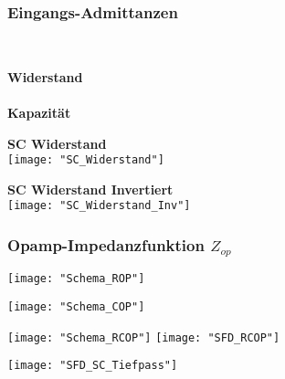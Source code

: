 \subsubsection{Eingangs-Admittanzen}
\\
\begin{minipage}[t]{0.2\textwidth}
	\textbf{Widerstand}\\
	\\
	
	\textbf{Kapazität}\\
\end{minipage}\hspace{0.05\textwidth}
\begin{minipage}[t]{0.3\textwidth}
	\textbf{SC Widerstand}\\
	\texttt{[image: "SC\_Widerstand"]}
\end{minipage}\hspace{0.05\textwidth}
\begin{minipage}[t]{0.3\textwidth}
	\textbf{SC Widerstand Invertiert}\\
	\texttt{[image: "SC\_Widerstand\_Inv"]}
\end{minipage}



\subsubsection{Opamp-Impedanzfunktion $Z_{op}$}
\begin{minipage}[t]{0.2\textwidth}
	\vspace{0pt}
	\centering
	\texttt{[image: "Schema\_ROP"]}
\end{minipage}\hspace{0.05\textwidth}
\begin{minipage}[t]{0.2\textwidth}
	\vspace{0pt}
	\centering
	\texttt{[image: "Schema\_COP"]}
\end{minipage}\hspace{0.05\textwidth}
\begin{minipage}[t]{0.2\textwidth}
	\vspace{0pt}
	\centering
	\texttt{[image: "Schema\_RCOP"]}
		\texttt{[image: "SFD\_RCOP"]}
\end{minipage}\hspace{0.05\textwidth}
\begin{minipage}[t]{0.2\textwidth}
	\vspace{0pt}
	\centering
	\texttt{[image: "SFD\_SC\_Tiefpass"]}
\end{minipage}
\vspace{2mm}


